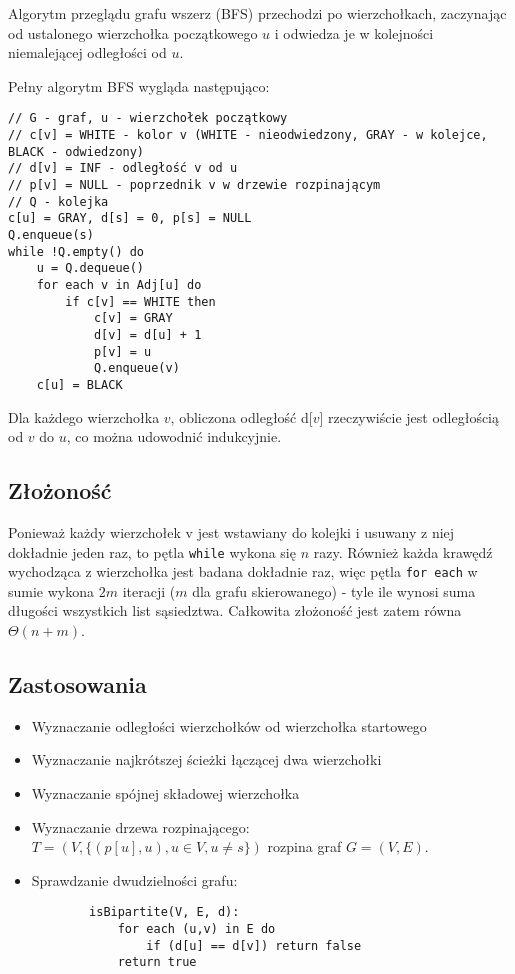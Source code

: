 Algorytm przeglądu grafu wszerz (BFS) przechodzi po wierzchołkach, zaczynając od ustalonego wierzchołka początkowego \( u \) i odwiedza je w kolejności niemalejącej odległości od \( u \).

Pełny algorytm BFS wygląda następująco:
\begin{verbatim}
// G - graf, u - wierzchołek początkowy
// c[v] = WHITE - kolor v (WHITE - nieodwiedzony, GRAY - w kolejce, BLACK - odwiedzony)
// d[v] = INF - odległość v od u
// p[v] = NULL - poprzednik v w drzewie rozpinającym
// Q - kolejka
c[u] = GRAY, d[s] = 0, p[s] = NULL
Q.enqueue(s)
while !Q.empty() do
    u = Q.dequeue()
    for each v in Adj[u] do
        if c[v] == WHITE then
            c[v] = GRAY
            d[v] = d[u] + 1
            p[v] = u
            Q.enqueue(v)
    c[u] = BLACK
\end{verbatim}
Dla każdego wierzchołka \( v \), obliczona odległość d[\(v\)] rzeczywiście jest odległością od \( v \) do \( u \), co można udowodnić indukcyjnie.

\subsection{Złożoność}
Ponieważ każdy wierzchołek v jest wstawiany do kolejki i usuwany z niej dokładnie jeden raz, to pętla \texttt{while} wykona się \( n \) razy.
Również każda krawędź wychodząca z wierzchołka jest badana dokładnie raz, więc pętla \texttt{for each} w sumie wykona \( 2m \) iteracji (\( m \) dla grafu skierowanego) - tyle ile wynosi suma długości wszystkich list sąsiedztwa.
Całkowita złożoność jest zatem równa \( \Theta(n + m) \).

\subsection{Zastosowania}
\begin{itemize}
    \item Wyznaczanie odległości wierzchołków od wierzchołka startowego
    \item Wyznaczanie najkrótszej ścieżki łączącej dwa wierzchołki
    \item Wyznaczanie spójnej składowej wierzchołka
    \item Wyznaczanie drzewa rozpinającego: \\
    \( T = (V, \{(p[u], u), u \in V, u \neq s\}) \) rozpina graf \( G=(V, E) \).
    \item Sprawdzanie dwudzielności grafu:
    \begin{verbatim}
        isBipartite(V, E, d):
            for each (u,v) in E do
                if (d[u] == d[v]) return false
            return true       
    \end{verbatim}
\end{itemize}